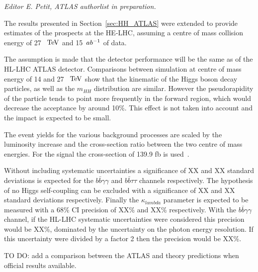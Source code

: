 \begin{center}
\textit{Editor E. Petit, ATLAS authorlist in preparation.}
\end{center}

The results presented in Section~\ref{sec:HH_ATLAS} were extended to provide estimates of the prospects at the HE-LHC, assuming a centre of mass collision energy of 27~$~\text{TeV}$ and 15~$ab^{-1}$ of data.

The assumption is made that the detector performance will be the same as of the HL-LHC ATLAS detector. Comparisons between simulation at centre of mass energy of 14 and 27~$~\text{TeV}$ show that the kinematic of the Higgs boson decay particles, as well as the $m_{HH}$ distribution are similar. However the pseudorapidity of the particle tends to point more frequently in the forward region, which would decrease the acceptance by around 10\%. This effect is not taken into account and the impact is expected to be small.

The event yields for the various background processes are scaled by the luminosity increase and the cross-section ratio between the two centre of mass energies. For the signal the cross-section of 139.9 fb is used~\cite{HHxsec}.

Without including systematic uncertainties a significance of XX and XX standard deviations is expected for the $b\bar{b}\gamma\gamma$ and $b\bar{b}\tau\tau$ channels respectively.
The hypothesis of no Higgs self-coupling can be excluded with a significance of XX and XX standard deviations respectively. Finally the $\kappa_{lambda}$ parameter is expected to be measured with a 68\% CI precision of XX\% and XX\% respectively.
With the $b\bar{b}\gamma\gamma$ channel, if the HL-LHC systematic uncertainties were considered this precision would be XX\%, dominated by the uncertainty on the photon energy resolution. If this uncertainty were divided by a factor 2 then the precision would be XX\%.


TO DO: add a comparison between the ATLAS and theory predictions when official results available.
